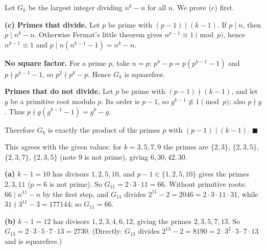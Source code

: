 Let $G_k$ be the largest integer dividing $n^k-n$ for all $n$. We prove (c) first.

\textbf{(c) Primes that divide.} Let $p$ be prime with $(p-1)\mid(k-1)$. If $p\mid n$, then $p\mid n^k-n$. Otherwise Fermat's little theorem gives $n^{p-1}\equiv1\pmod p$, hence $n^{k-1}\equiv1$ and $p\mid n(n^{k-1}-1)=n^k-n$.

\textbf{No square factor.} For a prime $p$, take $n=p$: $p^k-p=p\left(p^{k-1}-1\right)$ and $p\nmid p^{k-1}-1$, so $p^2\nmid p^k-p$. Hence $G_k$ is squarefree.

\textbf{Primes that do not divide.} Let $p$ be prime with $(p-1)\nmid(k-1)$, and let $g$ be a primitive root modulo $p$. Its order is $p-1$, so $g^{k-1}\not\equiv1\pmod p$; also $p\nmid g$. Thus $p\nmid g\left(g^{k-1}-1\right)=g^k-g$.

Therefore $G_k$ is exactly the product of the primes $p$ with $(p-1)\mid(k-1)$. $\blacksquare$

This agrees with the given values: for $k=3,5,7,9$ the primes are $\{2,3\}$, $\{2,3,5\}$, $\{2,3,7\}$, $\{2,3,5\}$ (note $9$ is not prime), giving $6,30,42,30$.

\textbf{(a)} $k-1=10$ has divisors $1,2,5,10$, and $p-1\in\{1,2,5,10\}$ gives the primes $2,3,11$ ($p=6$ is not prime). So $G_{11}=2\cdot3\cdot11=\boxed{66}$. Without primitive roots: $66\mid n^{11}-n$ by the first step, and $G_{11}$ divides $2^{11}-2=2046=2\cdot3\cdot11\cdot31$, while $31\nmid3^{11}-3=177144$; so $G_{11}=66$.

\textbf{(b)} $k-1=12$ has divisors $1,2,3,4,6,12$, giving the primes $2,3,5,7,13$. So $G_{13}=2\cdot3\cdot5\cdot7\cdot13=\boxed{2730}$. (Directly: $G_{13}$ divides $2^{13}-2=8190=2\cdot3^2\cdot5\cdot7\cdot13$ and is squarefree.)
